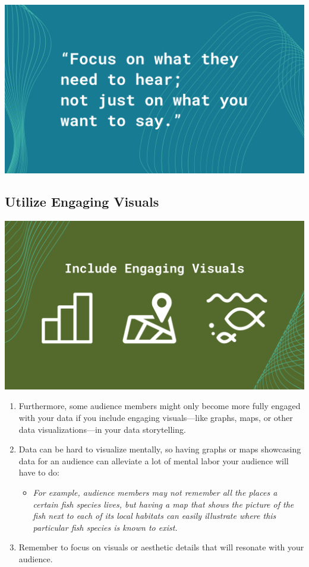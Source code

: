 \documentclass[
]{book}
\providecommand{\tightlist}{%
  \setlength{\itemsep}{0pt}\setlength{\parskip}{0pt}}
\begin{document}
\includegraphics{images/Data-Storytelling-Quote.png}

\hypertarget{utilize-engaging-visuals}{%
\subsection{Utilize Engaging Visuals}\label{utilize-engaging-visuals}}

\includegraphics{images/Data-Storytelling-3.png}

\begin{enumerate}
\def\labelenumi{\arabic{enumi}.}
\tightlist
\item
  Furthermore, some audience members might only become more fully engaged with your data if you include engaging visuals---like graphs, maps, or other data visualizations---in your data storytelling.
\item
  Data can be hard to visualize mentally, so having graphs or maps showcasing data for an audience can alleviate a lot of mental labor your audience will have to do:

  \begin{itemize}
  \tightlist
  \item
    \emph{For example, audience members may not remember all the places a certain fish species lives, but having a map that shows the picture of the fish next to each of its local habitats can easily illustrate where this particular fish species is known to exist.}
  \end{itemize}
\item
  Remember to focus on visuals or aesthetic details that will resonate with your audience.
\end{enumerate}
\end{document}
